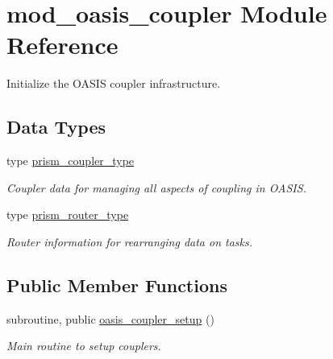 \hypertarget{classmod__oasis__coupler}{\section{mod\+\_\+oasis\+\_\+coupler Module Reference}
\label{classmod__oasis__coupler}
}


Initialize the O\+A\+S\+I\+S coupler infrastructure.  


\subsection*{Data Types}
\begin{DoxyCompactItemize}
\item 
type \hyperlink{structmod__oasis__coupler_1_1prism__coupler__type}{prism\+\_\+coupler\+\_\+type}
\begin{DoxyCompactList}\small\item\em Coupler data for managing all aspects of coupling in O\+A\+S\+I\+S. \end{DoxyCompactList}\item 
type \hyperlink{structmod__oasis__coupler_1_1prism__router__type}{prism\+\_\+router\+\_\+type}
\begin{DoxyCompactList}\small\item\em Router information for rearranging data on tasks. \end{DoxyCompactList}\end{DoxyCompactItemize}
\subsection*{Public Member Functions}
\begin{DoxyCompactItemize}
\item 
subroutine, public \hyperlink{classmod__oasis__coupler_ab48c4d4ee118f948ccc286eec5b509ec}{oasis\+\_\+coupler\+\_\+setup} ()
\begin{DoxyCompactList}\small\item\em Main routine to setup couplers. \end{DoxyCompactList}\end{DoxyCompactItemize}
